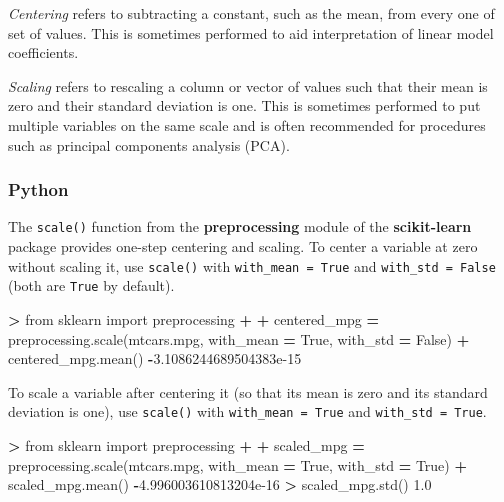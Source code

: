 \documentclass[
]{book}
\newenvironment{Shaded}{\begin{snugshade}}{\end{snugshade}}
\newcommand{\FloatTok}[1]{\textcolor[rgb]{0.00,0.00,0.81}{#1}}
\newcommand{\ImportTok}[1]{#1}
\newcommand{\NormalTok}[1]{#1}
\newcommand{\OperatorTok}[1]{\textcolor[rgb]{0.81,0.36,0.00}{\textbf{#1}}}
\newcommand{\VariableTok}[1]{\textcolor[rgb]{0.00,0.00,0.00}{#1}}
\begin{document}
\emph{Centering} refers to subtracting a constant, such as the mean, from every one of set of values. This is sometimes performed to aid interpretation of linear model coefficients.

\emph{Scaling} refers to rescaling a column or vector of values such that their mean is zero and their standard deviation is one. This is sometimes performed to put multiple variables on the same scale and is often recommended for procedures such as principal components analysis (PCA).

\hypertarget{python-38}{%
\subsubsection*{Python}\label{python-38}}

The \texttt{scale()} function from the \textbf{preprocessing} module of the \textbf{scikit-learn} package provides one-step centering and scaling. To center a variable at zero without scaling it, use \texttt{scale()} with \texttt{with\_mean\ =\ True} and \texttt{with\_std\ =\ False} (both are \texttt{True} by default).

\begin{Shaded}
\begin{Highlighting}[]
\OperatorTok{\textgreater{}} \ImportTok{from}\NormalTok{ sklearn }\ImportTok{import}\NormalTok{ preprocessing}
\OperatorTok{+} 
\OperatorTok{+}\NormalTok{ centered\_mpg }\OperatorTok{=}\NormalTok{ preprocessing.scale(mtcars.mpg, with\_mean }\OperatorTok{=} \VariableTok{True}\NormalTok{, with\_std }\OperatorTok{=} \VariableTok{False}\NormalTok{)}
\OperatorTok{+}\NormalTok{ centered\_mpg.mean()}
\OperatorTok{{-}}\FloatTok{3.1086244689504383e{-}15}
\end{Highlighting}
\end{Shaded}

To scale a variable after centering it (so that its mean is zero and its standard deviation is one), use \texttt{scale()} with \texttt{with\_mean\ =\ True} and \texttt{with\_std\ =\ True}.

\begin{Shaded}
\begin{Highlighting}[]
\OperatorTok{\textgreater{}} \ImportTok{from}\NormalTok{ sklearn }\ImportTok{import}\NormalTok{ preprocessing}
\OperatorTok{+} 
\OperatorTok{+}\NormalTok{ scaled\_mpg }\OperatorTok{=}\NormalTok{ preprocessing.scale(mtcars.mpg, with\_mean }\OperatorTok{=} \VariableTok{True}\NormalTok{, with\_std }\OperatorTok{=} \VariableTok{True}\NormalTok{)}
\OperatorTok{+}\NormalTok{ scaled\_mpg.mean()}
\OperatorTok{{-}}\FloatTok{4.996003610813204e{-}16}
\OperatorTok{\textgreater{}}\NormalTok{ scaled\_mpg.std()}
\FloatTok{1.0}
\end{Highlighting}
\end{Shaded}
\end{document}
